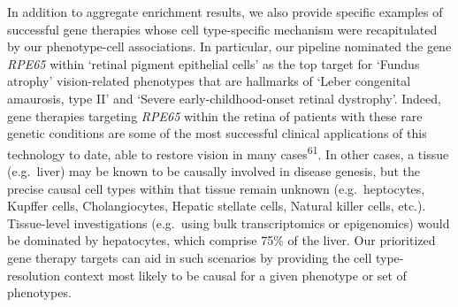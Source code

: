 \documentclass[
]{article}
\begin{document}
In addition to aggregate enrichment results, we also provide specific
examples of successful gene therapies whose cell type-specific mechanism
were recapitulated by our phenotype-cell associations. In particular,
our pipeline nominated the gene \emph{RPE65} within `retinal pigment
epithelial cells' as the top target for `Fundus atrophy' vision-related
phenotypes that are hallmarks of `Leber congenital amaurosis, type II'
and `Severe early-childhood-onset retinal dystrophy'. Indeed, gene
therapies targeting \emph{RPE65} within the retina of patients with
these rare genetic conditions are some of the most successful clinical
applications of this technology to date, able to restore vision in many
cases\textsuperscript{61}. In other cases, a tissue (e.g.~liver) may be
known to be causally involved in disease genesis, but the precise causal
cell types within that tissue remain unknown (e.g.~heptocytes, Kupffer
cells, Cholangiocytes, Hepatic stellate cells, Natural killer cells,
etc.). Tissue-level investigations (e.g.~using bulk transcriptomics or
epigenomics) would be dominated by hepatocytes, which comprise 75\% of
the liver. Our prioritized gene therapy targets can aid in such
scenarios by providing the cell type-resolution context most likely to
be causal for a given phenotype or set of phenotypes.
\end{document}
